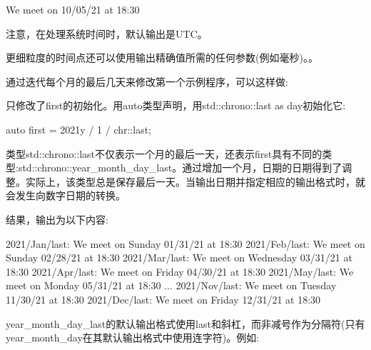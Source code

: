 \begin{shell}
We meet on 10/05/21 at 18:30
\end{shell}

注意，在处理系统时间时，默认输出是UTC。

更细粒度的时间点还可以使用输出精确值所需的任何参数(例如毫秒)。。


通过迭代每个月的最后几天来修改第一个示例程序，可以这样做:



只修改了first的初始化。用auto类型声明，用std::chrono::last as day初始化它:

\begin{cpp}
auto first = 2021y / 1 / chr::last;
\end{cpp}

类型std::chrono::last不仅表示一个月的最后一天，还表示first具有不同的类型:std::chrono::year\_month\_day\_last。通过增加一个月，日期的日期得到了调整。实际上，该类型总是保存最后一天。当输出日期并指定相应的输出格式时，就会发生向数字日期的转换。

结果，输出为以下内容:

\begin{shell}
2021/Jan/last:
 We meet on Sunday 01/31/21 at 18:30
2021/Feb/last:
 We meet on Sunday 02/28/21 at 18:30
2021/Mar/last:
 We meet on Wednesday 03/31/21 at 18:30
2021/Apr/last:
 We meet on Friday 04/30/21 at 18:30
2021/May/last:
 We meet on Monday 05/31/21 at 18:30
...
2021/Nov/last:
 We meet on Tuesday 11/30/21 at 18:30
2021/Dec/last:
 We meet on Friday 12/31/21 at 18:30
\end{shell}

year\_month\_day\_last的默认输出格式使用last和斜杠，而非减号作为分隔符(只有year\_month\_day在其默认输出格式中使用连字符)。例如:


